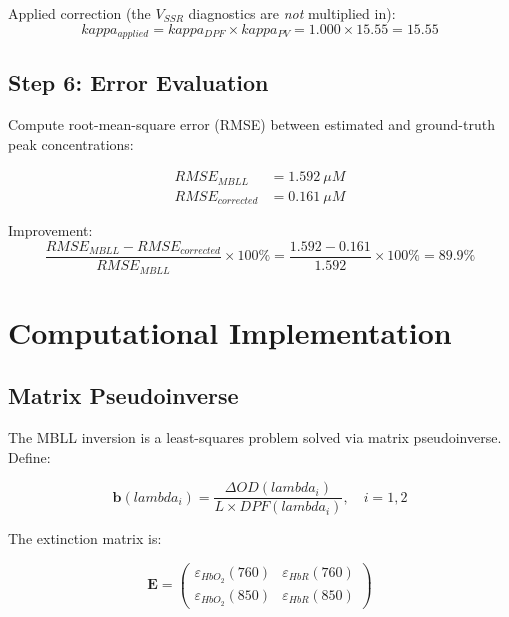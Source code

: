 \documentclass[12pt]{article}
\def\kappa{kappa}%
\def\lambda{lambda}%
\def\mathrm#1{#1}%
\def\text#1{#1}%
\begin{document}
Applied correction (the $V_{\mathrm{SSR}}$ diagnostics are \emph{not} multiplied in):
\begin{equation}
\kappa_{\text{applied}} = \kappa_{\text{DPF}} \times \kappa_{\text{PV}} = 1.000 \times 15.55 = 15.55
\end{equation}

\subsection{Step 6: Error Evaluation}

Compute root-mean-square error (RMSE) between estimated and ground-truth peak concentrations:

\begin{align}
\text{RMSE}_{\text{MBLL}} &= 1.592~\mu\text{M} \\
\text{RMSE}_{\text{corrected}} &= 0.161~\mu\text{M}
\end{align}

Improvement:
\begin{equation}
\frac{\text{RMSE}_{\text{MBLL}} - \text{RMSE}_{\text{corrected}}}{\text{RMSE}_{\text{MBLL}}} \times 100\% = \frac{1.592 - 0.161}{1.592} \times 100\% = 89.9\%
\end{equation}

\section{Computational Implementation}

\subsection{Matrix Pseudoinverse}

The MBLL inversion is a least-squares problem solved via matrix pseudoinverse. Define:

\begin{equation}
\mathbf{b}(\lambda_i) = \frac{\Delta\text{OD}(\lambda_i)}{L \times \text{DPF}(\lambda_i)}, \quad i = 1, 2
\end{equation}

The extinction matrix is:

\begin{equation}
\mathbf{E} = \begin{pmatrix} \varepsilon_{\text{HbO}_2}(760) & \varepsilon_{\text{HbR}}(760) \\ \varepsilon_{\text{HbO}_2}(850) & \varepsilon_{\text{HbR}}(850) \end{pmatrix}
\end{equation}
\end{document}

